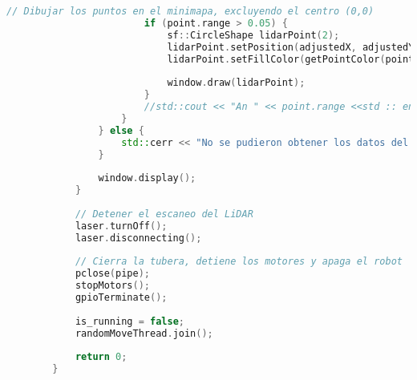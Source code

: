 \begin{lstlisting}[language={C++}, caption={Segundo ajuste de c\'odigo}, label={SegundoAjuste}]
                        // Dibujar los puntos en el minimapa, excluyendo el centro (0,0)
                        if (point.range > 0.05) {
                            sf::CircleShape lidarPoint(2);
                            lidarPoint.setPosition(adjustedX, adjustedY);
                            lidarPoint.setFillColor(getPointColor(point.range, max_range));
        
                            window.draw(lidarPoint);
                        }
                        //std::cout << "An " << point.range <<std :: endl;
                    }
                } else {
                    std::cerr << "No se pudieron obtener los datos del LiDAR." << std::endl;
                }
        
                window.display();
            }
        
            // Detener el escaneo del LiDAR
            laser.turnOff();
            laser.disconnecting();
        
            // Cierra la tubera, detiene los motores y apaga el robot
            pclose(pipe);
            stopMotors();
            gpioTerminate();
        
            is_running = false;
            randomMoveThread.join();
        
            return 0;
        }
    \end{lstlisting}
